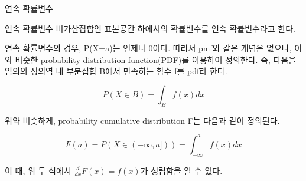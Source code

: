 \documentclass{beamer}
\begin{document}
\begin{frame}{연속 확률변수}
\begin{block}{연속 확률변수}
비가산집합인 표본공간 하에서의 확률변수를 연속 확률변수라고 한다. 
\end{block}

연속 확률변수의 경우, P(X=a)는 언제나 0이다. 따라서 pmf와 같은 개념은 없으나, 이와 비슷한 probability distribution function(PDF)를 이용하여 정의한다. 즉, 다음을 임의의 정의역 내 부분집합 B에서 만족하는 함수 f를 pdf라 한다. 

\begin{equation} 
P(X \in B) = \int_B f(x)dx 
\end{equation}

위와 비슷하게, probability cumulative distribution F는 다음과 같이 정의된다. 

\begin{equation} 
F(a) = P(X \in (-\infty, a])) = \int^a_{-\infty} f(x)dx
\end{equation}

이 때, 위 두 식에서 $\frac{d}{dx}F(x) = f(x)$가 성립함을 알 수 있다. 
\end{frame}
\end{document}
